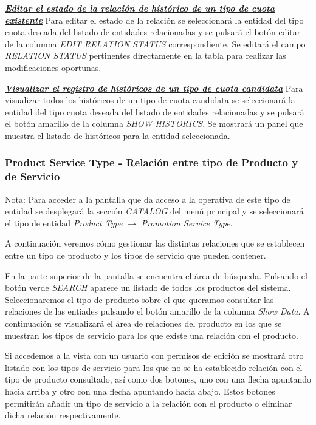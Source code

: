 \underline{\textsl{\textbf{Editar el estado de la relación de histórico de un tipo de cuota existente}}}
Para editar el estado de la relación se seleccionará la entidad del tipo cuota deseada del listado de entidades relacionadas y se pulsará el botón editar de la columna \textit{EDIT RELATION STATUS} correspondiente. Se editará el campo \emph{RELATION STATUS}  pertinentes directamente en la tabla para realizar las modificaciones oportunas.

\underline{\textsl{\textbf{Visualizar el registro de históricos de un tipo de cuota candidata}}}
Para visualizar todos los históricos de un tipo de cuota candidata se seleccionará la entidad del tipo cuota deseada del listado de entidades relacionadas y se pulsará el botón amarillo de la columna \textit{SHOW HISTORICS}. Se mostrará un panel que muestra el listado de históricos para la entidad seleccionada. 



\subsubsection{Product Service Type - Relación entre tipo de Producto y de Servicio}
\label{sub:product-service-type-relation}

Nota: Para acceder a la pantalla que da acceso a la operativa de este tipo de entidad se desplegará la sección \emph{CATALOG} del menú principal y se seleccionará el tipo de entidad \emph{Product Type} $\rightarrow$  \emph{Promotion Service Type}.


A continuación veremos cómo gestionar las distintas relaciones que se establecen entre un tipo de producto y los tipos de servicio que pueden contener.


En la parte superior de la pantalla se encuentra el área de búsqueda. Pulsando el botón verde \emph{SEARCH} aparece un listado de todos los productos del sistema. Seleccionaremos el tipo de producto sobre el que queramos consultar las relaciones de las entiades pulsando el botón amarillo de la columna \emph{Show Data}. A continuación se visualizará el área de relaciones del producto en los que se muestran los tipos de servicio para los que existe una relación con el producto.

Si accedemos a la vista con un usuario con permisos de edición se mostrará otro listado con los tipos de servicio para los que no se ha establecido relación con el tipo de producto consultado, así como dos botones, uno con una flecha apuntando hacia arriba y otro con una flecha apuntando hacia abajo. Estos botones permitirán añadir un tipo de servicio a la relación con el producto o eliminar dicha relación respectivamente. 

